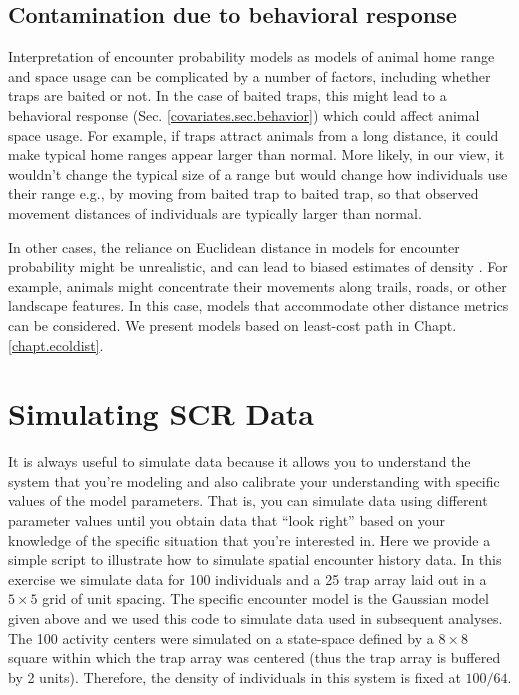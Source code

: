 \subsection{Contamination due to behavioral response}

Interpretation of encounter probability models as models
of animal home range and space usage can be complicated by a number of
factors, including whether traps are baited or not. In the case of
baited traps, this might lead to a
behavioral response (Sec. \ref{covariates.sec.behavior}) which could
 affect animal space usage. For example, if traps attract
animals from a long distance, it could make typical home ranges appear
larger than normal.
 More likely, in our view, it wouldn't
change the typical size of a range but would change how individuals
use their range e.g., by moving from baited trap to baited trap, so
that observed movement distances of individuals are typically larger
than normal. 

In other cases, the reliance on Euclidean distance in models for
encounter probability might be unrealistic, and can lead to biased
estimates of density \citep{royle_etal:2012ecol}.  For example,
animals might concentrate their movements along trails, roads, or
other landscape features. In this case, models that accommodate other
distance metrics can be considered. We present models based on
least-cost path in Chapt. \ref{chapt.ecoldist}. 


















\section{Simulating SCR Data}
\label{scr0.sec.simulating}

It is always useful to simulate data because it allows you to
understand the system that you're modeling and also calibrate your
understanding with specific values of the model parameters.
That is, you can
simulate data using different parameter values until you obtain data
that ``look right'' based on your knowledge of the specific situation
that you're interested in. Here we provide a simple script to
illustrate how to simulate spatial encounter history data. In this
exercise we simulate data for 100 individuals and a 25 trap array laid
out in a $5 \times 5$ grid of unit spacing.  The specific encounter
model is the Gaussian model given above and we used this code to
simulate data used in subsequent analyses.  The 100 activity centers
were simulated on a state-space defined by a $8 \times 8$ square
within which the trap array was centered (thus the trap array is
buffered by 2 units). Therefore, the density of individuals in this
system is fixed at $100/64$.

